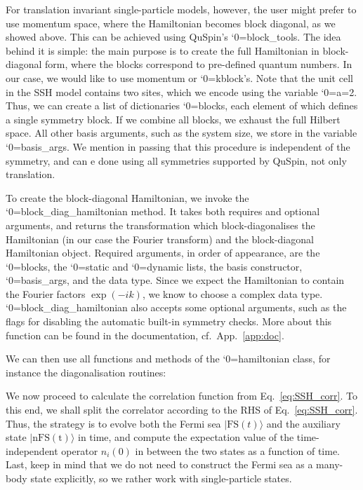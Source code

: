\documentclass{SciPost}
\newcommand\0{\scalebox{-1}[1]{0}}
\let\svttfamily\ttfamily
\renewcommand\ttfamily{\svttfamily\catcode`0=\active }
\renewcommand\texttt{\bgroup\ttfamily\texttthelp}
\def\texttthelp#1{#1\egroup}
\newcommand{\SSHcode}{example5.py}
\begin{document}
For translation invariant single-particle models, however, the user might prefer to use momentum space, where the Hamiltonian becomes block diagonal, as we showed above. This can be achieved using QuSpin's \texttt{block\_tools}. The idea behind it is simple: the main purpose is to create the full Hamiltonian in block-diagonal form, where the blocks correspond to pre-defined quantum numbers. In our case, we would like to use momentum or \texttt{kblock}'s. Note that the unit cell in the SSH model contains two sites, which we encode using the variable \texttt{a=2}. Thus, we can create a list of dictionaries \texttt{blocks}, each element of which defines a single symmetry block. If we combine all blocks, we exhaust the full Hilbert space. All other basis arguments, such as the system size, we store in the variable \texttt{basis\_args}. We mention in passing that this procedure is independent of the symmetry, and can e done using all symmetries supported by QuSpin, not only translation.

To create the block-diagonal Hamiltonian, we invoke the \texttt{block\_diag\_hamiltonian} method. It takes both requires and optional arguments, and returns the transformation which block-diagonalises the Hamiltonian (in our case the Fourier transform) and the block-diagonal Hamiltonian object. Required arguments, in order of appearance, are the \texttt{blocks}, the \texttt{static} and \texttt{dynamic} lists, the basis constructor, \texttt{basis\_args}, and the data type. Since we expect the Hamiltonian to contain the Fourier factors $\exp(-ik)$, we know to choose a complex data type. \texttt{block\_diag\_hamiltonian} also accepts some optional arguments, such as the flags for disabling the automatic built-in symmetry checks. More about this function can be found in the documentation, cf.~App.~\ref{app:doc}.

We can then use all functions and methods of the \texttt{hamiltonian} class, for instance the diagonalisation routines:


We now proceed to calculate the correlation function from Eq.~\eqref{eq:SSH_corr}. To this end, we shall split the correlator according to the RHS of Eq.~\eqref{eq:SSH_corr}. Thus, the strategy is to evolve both the Fermi sea $|\mathrm{FS}(t)\rangle$ and the auxiliary state $|\mathrm{nFS(t)}\rangle$ in time, and compute the expectation value of the time-independent operator $n_i(0)$ in between the two states as a function of time. Last, keep in mind that we do not need to construct the Fermi sea as a many-body state explicitly, so we rather work with single-particle states.
\end{document}
